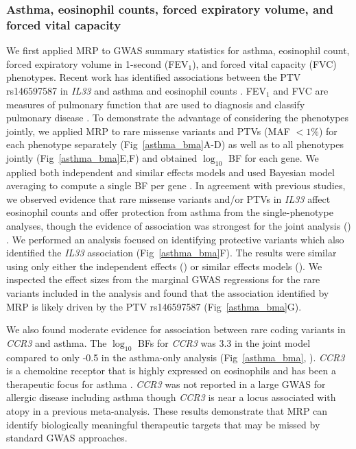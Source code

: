 \subsubsection*{Asthma, eosinophil counts, forced expiratory volume, and forced vital capacity}
We first applied MRP to GWAS summary statistics for asthma, eosinophil count, forced expiratory volume in 1-second (FEV$_1$), and forced vital capacity (FVC) phenotypes. Recent work has identified associations between the PTV rs146597587 in \textit{IL33} and asthma and eosinophil counts \cite{DeBoever179762, 10.1371/journal.pgen.1006659}. FEV$_1$ and FVC are measures of pulmonary function that are used to diagnosis and classify pulmonary disease \cite{Swanney1046}. To demonstrate the advantage of considering the phenotypes jointly, we applied MRP to rare missense variants and PTVs (MAF $< 1\%$) for each phenotype separately (Fig~\ref{asthma_bma}A-D) as well as to all phenotypes jointly (Fig~\ref{asthma_bma}E,F) and obtained $\log_{10}$ BF for each gene. We applied both independent and similar effects models and used Bayesian model averaging to compute a single BF per gene \cite{10.2307/2676803}. In agreement with previous studies, we observed evidence that rare missense variants and/or PTVs in \textit{IL33} affect eosinophil counts and offer protection from asthma from the single-phenotype analyses, though the evidence of association was strongest for the joint analysis () \cite{DeBoever179762, 10.1371/journal.pgen.1006659}. We performed an analysis focused on identifying protective variants which also identified the \textit{IL33} association (Fig~\ref{asthma_bma}F). The results were similar using only either the independent effects () or similar effects models (). We inspected the effect sizes from the marginal GWAS regressions for the rare variants included in the analysis and found that the association identified by MRP is likely driven by the PTV rs146597587 (Fig~\ref{asthma_bma}G).

We also found moderate evidence for association between rare coding variants in \textit{CCR3} and asthma. The $\log_{10}$ BFs for \textit{CCR3} was 3.3 in the joint model compared to only -0.5 in the asthma-only analysis  (Fig~\ref{asthma_bma}, ). \textit{CCR3} is a chemokine receptor that is highly expressed on eosinophils and has been a therapeutic focus for asthma \cite{Neighbour:2014jw, Pease:2014em}. \textit{CCR3} was not reported in a large GWAS for allergic disease including asthma\cite{Ferreira:2017ba} though \textit{CCR3} is near a locus associated with atopy in a previous meta-analysis\cite{Ober:2011jk}. These results demonstrate that MRP can identify biologically meaningful therapeutic targets that may be missed by standard GWAS approaches.

